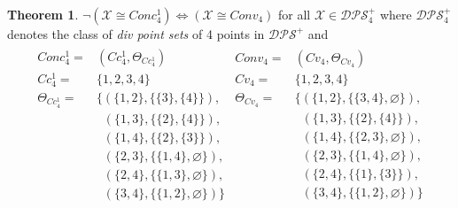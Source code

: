 \documentclass[11pt, oneside]{article}      %
\theoremstyle{definition}
\newtheorem{theo}{Theorem}
\numberwithin{equation}{section}
\theoremstyle{c}
\begin{document}
\begin{theo} $\neg ( \mathscr{X} \cong Conc_4^1 ) \Leftrightarrow ( \mathscr{X} \cong Conv_4 )$ for all $\mathscr{X} \in \mathscr{DPS}^+_4$ where $\mathscr{DPS}^+_4$ denotes the class of \textit{div point sets} of 4 points in $\mathscr{DPS}^+$ and
\begin{gather}
\begin{split} \label{c4}
    Conc_4^1 = &(Cc_4^1, \Theta_{Cc_4^1}) \\
    Cc_4^1 = &\{1,2,3,4\} \\
    \Theta_{Cc_4^1} = & \{(\{1,2\},\{\{3\},\{4\}\}), \\
    &\;\; (\{1,3\},\{\{2\},\{4\}\}), \\
    &\;\; (\{1,4\},\{\{2\},\{3\}\}), \\
    &\;\; (\{2,3\}, \{\{1,4\},\varnothing\}), \\
    &\;\; (\{2,4\},\{\{1,3\},\varnothing\}), \\
    &\;\; (\{3,4\}, \{\{1,2\},\varnothing\})\}
 \end{split}
\begin{split}
    Conv_4  = &(Cv_4, \Theta_{Cv_4}) \\
    Cv_4 = &\{1,2,3,4\} \\
    \Theta_{Cv_4} = & \{(\{1,2\},\{\{3,4\},\varnothing\}), \\
    &\;\; (\{1,3\},\{\{2\},\{4\}\}), \\
    &\;\; (\{1,4\},\{\{2,3\},\varnothing\}), \\
    &\;\; (\{2,3\}, \{\{1,4\},\varnothing\}), \\
    &\;\; (\{2,4\},\{\{1\},\{3\}\}), \\
    &\;\; (\{3,4\}, \{\{1,2\},\varnothing\})\}
 \end{split}
\end{gather}
\end{theo}
\end{document}
